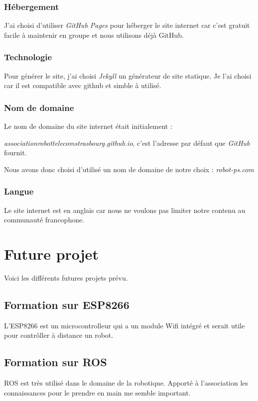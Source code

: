 \documentclass[11pt,a4paper]{report}
\begin{document}
      \subsubsection{Hébergement}
        J'ai choisi d'utiliser \emph{GitHub Pages} pour héberger le site internet car c'est gratuit facile à maintenir en groupe et nous utilisons déjà GitHub.

      \subsubsection{Technologie}
        Pour générer le site, j'ai choisi \emph{Jekyll} un générateur de site statique. Je l'ai choisi car il est compatible avec github et simble à utilisé.

      \subsubsection{Nom de domaine}
        Le nom de domaine du site internet était initialement :

        \emph{associationrobottelecomstrasbourg.github.io}, c'est l'adresse par défaut que \emph{GitHub} fournit.

        Nous avons donc choisi d'utilisé un nom de domaine de notre choix : \emph{robot-ps.com}

      \subsubsection{Langue}
        Le site internet est en anglais car nous ne voulons pas limiter notre contenu au communauté francophone.

  \section{Future projet}
    Voici les différents futures projets prévu.

    \subsection{Formation sur ESP8266}
      L'ESP8266 est un microcontrolleur qui a un module Wifi intégré et serait utile pour contr\^oller à distance un robot.

    \subsection{Formation sur ROS}
      ROS est très utilisé dans le domaine de la robotique. Apporté à l'association les connaissances pour le prendre en main me semble important.
\end{document}
